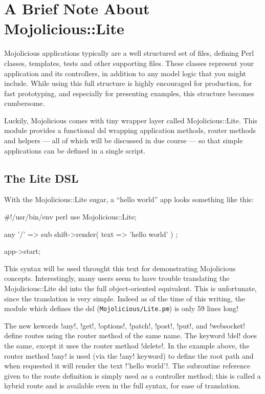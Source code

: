 \section{A Brief Note About Mojolicious::Lite} \label{sec:lite_not_magical}

Mojolicious applications typically are a well structured set of files, defining Perl classes, templates, tests and other supporting files.
These classes represent your application and its controllers, in addition to any model logic that you might include.
While using this full structure is highly encouraged for production, for fast prototyping, and especially for presenting examples, this structure becomes cumbersome.

Luckily, Mojolicious comes with tiny wrapper layer called Mojolicious::Lite.
This module provides a functional dsl wrapping application methods, router methods and helpers --- all of which will be discussed in due course --- so that simple applications can be defined in a single script.

\subsection{The Lite DSL}

With the Mojolicious::Lite sugar, a ``hello world'' app looks something like this:
\begin{mojolite}
#!/usr/bin/env perl
use Mojolicious::Lite;

any '/' => sub { shift->render( text => 'hello world' ) };

app->start;
\end{mojolite}

This syntax will be used throught this text for demonstrating Mojolicious concepts.
Interestingly, many users seem to have trouble translating the Mojolicious::Lite dsl into the full object-oriented equivalent.
This is unfortunate, since the translation is very simple.
Indeed as of the time of this writing, the module which defines the dsl (\verb!Mojolicious/Lite.pm!) is only 59 lines long!

The new kewords \lstmojolite!any!, \lstmojolite!get!, \lstmojolite!options!, \lstmojolite!patch!, 
\lstmojolite!post!, \lstmojolite!put!, and \lstmojolite!websocket! define routes using the router method of the same name. 
The keyword \lstmojolite!del! does the same, except it uses the router method \lstperl!delete!.
In the example above, the router method \lstperl!any! is used (via the \lstmojolite!any! keyword) 
to define the root path and when requested it will render the text \lstperl!'hello world'!.
The subroutine reference given to the route definition is simply used as a controller method; 
this is called a hybrid route and is available even in the full syntax, for ease of translation.

